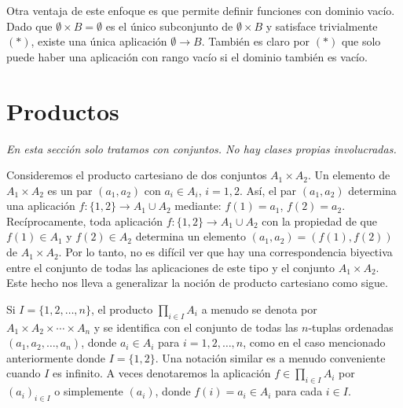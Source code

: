 Otra ventaja de este enfoque es que permite definir funciones con dominio vacío. Dado que \( \emptyset \times B = \emptyset \) es el único subconjunto de \( \emptyset \times B \) y satisface trivialmente $(*)$, existe una única aplicación \( \emptyset \to B \). También es claro por $(*)$ que solo puede haber una aplicación con rango vacío si el dominio también es vacío.

\clearpage
\section{Productos}

\textit{En esta sección solo tratamos con conjuntos. No hay clases propias involucradas.}
\vspace{0.5cm}

Consideremos el producto cartesiano de dos conjuntos \( A_1 \times A_2 \). Un elemento de \( A_1 \times A_2 \) es un par \( (a_1, a_2) \) con \( a_i \in A_i \), \( i = 1, 2 \). Así, el par \( (a_1, a_2) \) determina una aplicación \( f: \{1, 2\} \to A_1 \cup A_2 \) mediante: \( f(1) = a_1 \), \( f(2) = a_2 \). Recíprocamente, toda aplicación \( f: \{1, 2\} \to A_1 \cup A_2 \) con la propiedad de que \( f(1) \in A_1 \) y \( f(2) \in A_2 \) determina un elemento \( (a_1, a_2) = (f(1), f(2)) \) de \( A_1 \times A_2 \). Por lo tanto, no es difícil ver que hay una correspondencia biyectiva entre el conjunto de todas las aplicaciones de este tipo y el conjunto \( A_1 \times A_2 \). Este hecho nos lleva a generalizar la noción de producto cartesiano como sigue.


Si \( I = \{1, 2, \ldots, n\} \), el producto \( \prod_{i \in I} A_i \) a menudo se denota por \( A_1 \times A_2 \times \cdots \times A_n \) y se identifica con el conjunto de todas las \( n \)-tuplas ordenadas \( (a_1, a_2, \ldots, a_n) \), donde \( a_i \in A_i \) para \( i = 1, 2, \ldots, n \), como en el caso mencionado anteriormente donde \( I = \{1, 2\} \). Una notación similar es a menudo conveniente cuando \( I \) es infinito. A veces denotaremos la aplicación \( f \in \prod_{i \in I} A_i \) por \( (a_i)_{i \in I} \) o simplemente \( (a_i) \), donde \( f(i) = a_i \in A_i \) para cada \( i \in I \).

